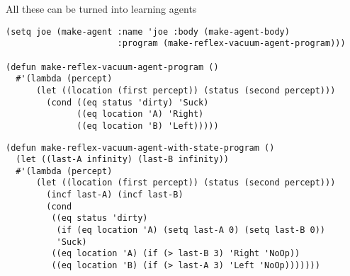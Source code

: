 \documentclass{article}
\begin{document}
\begin{huge}
All these can be turned into learning agents



\textwidth
{}



\medskip



\bigskip

\begin{verbatim}
(setq joe (make-agent :name 'joe :body (make-agent-body)
                      :program (make-reflex-vacuum-agent-program)))

(defun make-reflex-vacuum-agent-program ()
  #'(lambda (percept)
      (let ((location (first percept)) (status (second percept)))
        (cond ((eq status 'dirty) 'Suck)
              ((eq location 'A) 'Right)
              ((eq location 'B) 'Left)))))
\end{verbatim}




\textwidth
{}



\medskip



\bigskip

\begin{verbatim}
(defun make-reflex-vacuum-agent-with-state-program ()
  (let ((last-A infinity) (last-B infinity))
  #'(lambda (percept)
      (let ((location (first percept)) (status (second percept)))
        (incf last-A) (incf last-B)
        (cond 
         ((eq status 'dirty) 
          (if (eq location 'A) (setq last-A 0) (setq last-B 0))
          'Suck)
         ((eq location 'A) (if (> last-B 3) 'Right 'NoOp))
         ((eq location 'B) (if (> last-A 3) 'Left 'NoOp)))))))
\end{verbatim}





\end{huge}
\end{document}
